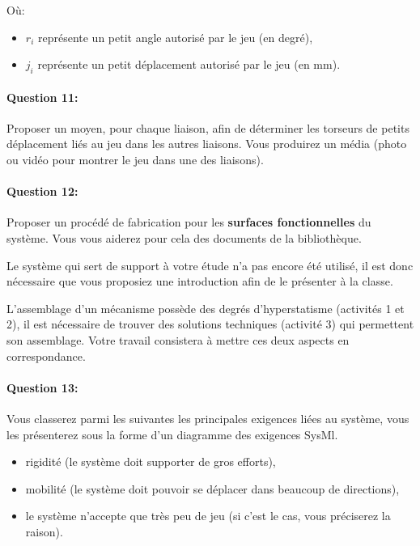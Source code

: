 Où:
\begin{itemize}
 \item $r_i$ représente un petit angle autorisé par le jeu (en degré),
 \item $j_i$ représente un petit déplacement autorisé par le jeu (en mm). 
\end{itemize}

\paragraph{Question 11:} Proposer un moyen, pour chaque liaison, afin de déterminer les torseurs de petits déplacement liés au jeu dans les autres liaisons. Vous produirez un média (photo ou vidéo pour montrer le jeu dans une des liaisons).

\paragraph{Question 12:} Proposer un procédé de fabrication pour les \textbf{surfaces fonctionnelles} du système. Vous vous aiderez pour cela des documents de la bibliothèque.

\cleardoublepage


Le système qui sert de support à votre étude n'a pas encore été utilisé, il est donc nécessaire que vous proposiez une introduction afin de le présenter à la classe.

L'assemblage d'un mécanisme possède des degrés d'hyperstatisme (activités 1 et 2), il est nécessaire de trouver des solutions techniques (activité 3) qui permettent son assemblage. Votre travail consistera à mettre ces deux aspects en correspondance.

\paragraph{Question 13:} Vous classerez parmi les suivantes les principales exigences liées au système, vous les présenterez sous la forme d'un diagramme des exigences SysMl.

\begin{itemize}
 \item rigidité (le système doit supporter de gros efforts),
 \item mobilité (le système doit pouvoir se déplacer dans beaucoup de directions),
 \item le système n'accepte que très peu de jeu (si c'est le cas, vous préciserez la raison).
\end{itemize}

